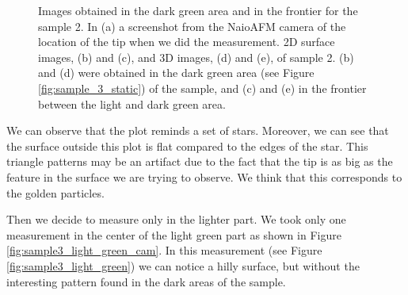 \documentclass[11pt,a4paper]{article}
\begin{document}
\begin{figure}[H]
\begin{subfigure}[b]{0.45\textwidth}
\caption{}
\end{subfigure}
\caption{Images obtained in the dark green area and in the frontier for the sample 2. In (a) a screenshot from the NaioAFM camera of the location of the tip when we did the measurement. 2D surface images, (b) and (c), and 3D images, (d) and (e), of sample 2. (b) and (d) were obtained in the dark green area (see Figure \ref{fig:sample_3_static}) of the sample, and (c) and (e) in the frontier between the light and dark green area.}
\end{figure}

We can observe that the plot reminds a set of stars. Moreover, we can see that the surface outside this plot is flat compared to the edges of the star. This triangle patterns may be an artifact due to the fact that the tip is as big as the feature in the surface we are trying to observe. We think that this corresponds to the golden particles.

Then we decide to measure only in the lighter part. We took only one measurement in the center of the light green part as shown in Figure \ref{fig:sample3_light_green_cam}. In this measurement (see Figure \ref{fig:sample3_light_green}) we can notice a hilly surface, but without the interesting pattern found in the dark areas of the sample.
\end{document}

